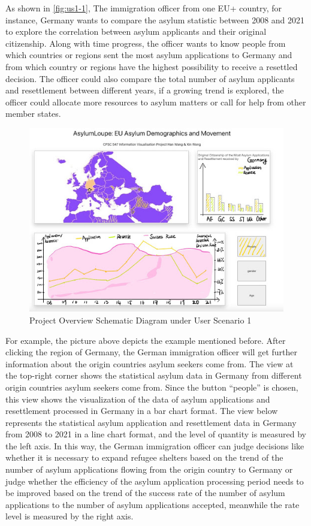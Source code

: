 \documentclass[journal]{vgtc}                %
\begin{document}
As shown in \autoref{fig:us1-1}, The immigration officer from one EU+ country, for instance, Germany wants to compare the asylum statistic between 2008 and 2021 to explore the correlation between asylum applicants and their original citizenship. Along with time progress, the officer wants to know people from which countries or regions sent the most asylum applications to Germany and from which country or regions have the highest possibility to receive a resettled decision. The officer could also compare the total number of asylum applicants and resettlement between different years, if a growing trend is explored, the officer could allocate more resources to asylum matters or call for help from other member states.

\begin{figure}[tb]
  \centering %
  \includegraphics[width=\columnwidth]{fig2}
  \caption{Project Overview Schematic Diagram under User Scenario 1}
  \label{fig:us1-1}
 \end{figure}

For example, the picture above depicts the example mentioned before. After clicking the region of Germany, the German immigration officer will get further information about the origin countries asylum seekers come from. The view at the top-right corner shows the statistical asylum data in Germany from different origin countries asylum seekers come from. Since the button “people” is chosen, this view shows the visualization of the data of asylum applications and resettlement processed in Germany in a bar chart format. The view below represents the statistical asylum application and resettlement data in Germany from 2008 to 2021 in a line chart format, and the level of quantity is measured by the left axis. In this way, the German immigration officer can judge decisions like whether it is necessary to expand refugee shelters based on the trend of the number of asylum applications flowing from the origin country to Germany or judge whether the efficiency of the asylum application processing period needs to be improved based on the trend of the success rate of the number of asylum applications to the number of asylum applications accepted, meanwhile the rate level is measured by the right axis.
\end{document}
